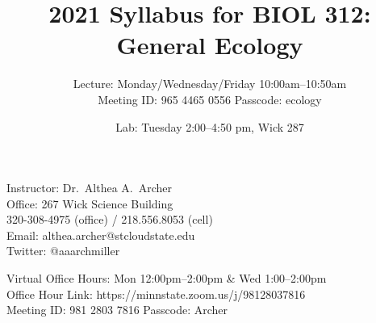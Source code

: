 \documentclass{tufte-handout}
\title{2021 Syllabus for BIOL 312: General Ecology}										%
\author{Lecture: Monday/Wednesday/Friday 10:00am--10:50am \\
\color{red} Meeting ID: 965 4465 0556
Passcode: ecology \color{black}}								%
\date{Lab: Tuesday 2:00--4:50 pm, Wick 287}
\begin{document}
\maketitle

Instructor: Dr.~Althea A.~Archer\\
Office: 267 Wick Science Building\\
320-308-4975 (office) / 218.556.8053 (cell)\\
Email: althea.archer@stcloudstate.edu\\
Twitter: @aaarchmiller

\color{gray} Virtual Office Hours: Mon 12:00pm--2:00pm \& Wed 1:00--2:00pm\\
Office Hour Link: https://minnstate.zoom.us/j/98128037816\\
Meeting ID: 981 2803 7816 Passcode: Archer \color{black}
\end{document}
